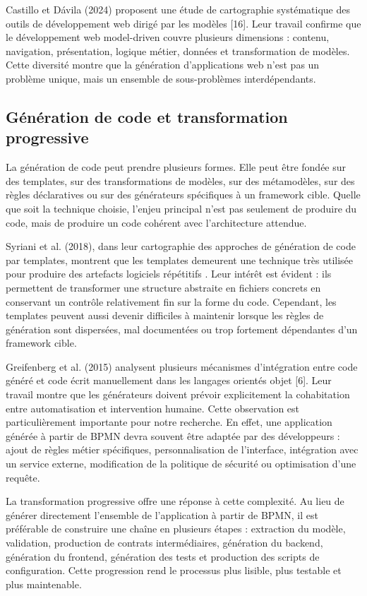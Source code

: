 Castillo et Dávila (2024) proposent une étude de cartographie systématique des outils de développement web dirigé par les modèles [16]. Leur travail confirme que le développement web model-driven couvre plusieurs dimensions : contenu, navigation, présentation, logique métier, données et transformation de modèles. Cette diversité montre que la génération d'applications web n'est pas un problème unique, mais un ensemble de sous-problèmes interdépendants.

\subsection{Génération de code et transformation progressive}

La génération de code peut prendre plusieurs formes. Elle peut être fondée sur des templates, sur des transformations de modèles, sur des métamodèles, sur des règles déclaratives ou sur des générateurs spécifiques à un framework cible. Quelle que soit la technique choisie, l'enjeu principal n'est pas seulement de produire du code, mais de produire un code cohérent avec l'architecture attendue.

Syriani et al. (2018), dans leur cartographie des approches de génération de code par templates, montrent que les templates demeurent une technique très utilisée pour produire des artefacts logiciels répétitifs \cite{syriani2018}. Leur intérêt est évident : ils permettent de transformer une structure abstraite en fichiers concrets en conservant un contrôle relativement fin sur la forme du code. Cependant, les templates peuvent aussi devenir difficiles à maintenir lorsque les règles de génération sont dispersées, mal documentées ou trop fortement dépendantes d'un framework cible.

Greifenberg et al. (2015) analysent plusieurs mécanismes d'intégration entre code généré et code écrit manuellement dans les langages orientés objet [6]. Leur travail montre que les générateurs doivent prévoir explicitement la cohabitation entre automatisation et intervention humaine. Cette observation est particulièrement importante pour notre recherche. En effet, une application générée à partir de BPMN devra souvent être adaptée par des développeurs : ajout de règles métier spécifiques, personnalisation de l'interface, intégration avec un service externe, modification de la politique de sécurité ou optimisation d'une requête.

La transformation progressive offre une réponse à cette complexité. Au lieu de générer directement l'ensemble de l'application à partir de BPMN, il est préférable de construire une chaîne en plusieurs étapes : extraction du modèle, validation, production de contrats intermédiaires, génération du backend, génération du frontend, génération des tests et production des scripts de configuration. Cette progression rend le processus plus lisible, plus testable et plus maintenable.

